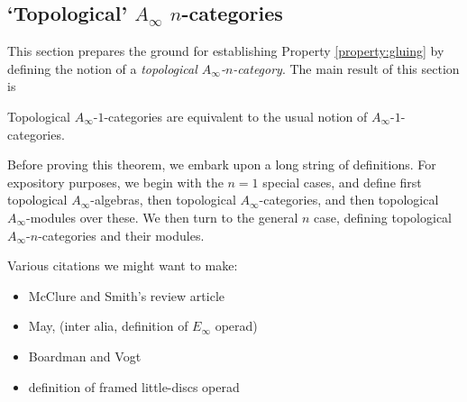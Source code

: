 \subsection{`Topological' $A_\infty$ $n$-categories}
\label{sec:topological-A-infty}%

This section prepares the ground for establishing Property \ref{property:gluing} by defining the notion of a \emph{topological $A_\infty$-$n$-category}.
The main result of this section is

\begin{thm}
Topological $A_\infty$-$1$-categories are equivalent to the usual notion of
$A_\infty$-$1$-categories.
\end{thm}

Before proving this theorem, we embark upon a long string of definitions.
For expository purposes, we begin with the $n=1$ special cases,
and define
first topological $A_\infty$-algebras, then topological $A_\infty$-categories, and then topological $A_\infty$-modules over these. We then turn
to the general $n$ case, defining topological $A_\infty$-$n$-categories and their modules.

\todo{}
Various citations we might want to make:
\begin{itemize}
\item \cite{MR2061854} McClure and Smith's review article
\item \cite{MR0420610} May, (inter alia, definition of $E_\infty$ operad)
\item \cite{MR0236922,MR0420609} Boardman and Vogt
\item \cite{MR1256989} definition of framed little-discs operad
\end{itemize}


